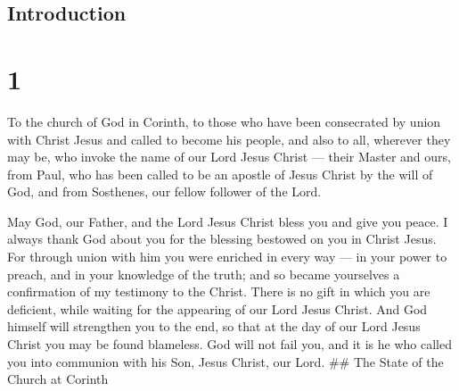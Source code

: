 \hypertarget{introduction}{%
\subsection{Introduction}\label{introduction}}

\hypertarget{section}{%
\section{1}\label{section}}

 To the church of God in Corinth, to those who have been
consecrated by union with Christ Jesus and called to become his people,
and also to all, wherever they may be, who invoke the name of our Lord
Jesus Christ --- their Master and ours,  from Paul, who has
been called to be an apostle of Jesus Christ by the will of God, and
from Sosthenes, our fellow follower of the Lord.

 May God, our Father, and the Lord Jesus Christ bless you
and give you peace.  I always thank God about you for the
blessing bestowed on you in Christ Jesus.  For through union
with him you were enriched in every way --- in your power to preach, and
in your knowledge of the truth;  and so became yourselves a
confirmation of my testimony to the Christ.  There is no
gift in which you are deficient, while waiting for the appearing of our
Lord Jesus Christ.  And God himself will strengthen you to
the end, so that at the day of our Lord Jesus Christ you may be found
blameless.  God will not fail you, and it is he who called
you into communion with his Son, Jesus Christ, our Lord. \#\# The State
of the Church at Corinth

